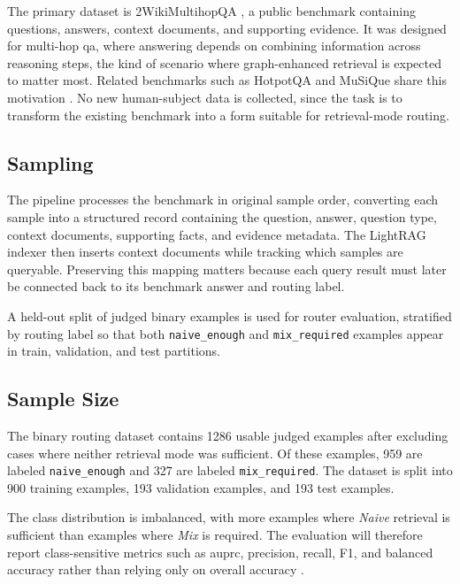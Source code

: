 \documentclass[english, bibtex]{kththesis}               %
\numberwithin{listing}{chapter}
\begin{document}
The primary dataset is 2WikiMultihopQA \cite{ho2020twowiki}, a public benchmark containing questions, answers, context documents, and supporting evidence. It was designed for multi-hop \gls{qa}, where answering depends on combining information across reasoning steps, the kind of scenario where graph-enhanced retrieval is expected to matter most. Related benchmarks such as HotpotQA and MuSiQue share this motivation \cite{yang2018hotpotqa,trivedi2022musique}. No new human-subject data is collected, since the task is to transform the existing benchmark into a form suitable for retrieval-mode routing.

\subsection{Sampling}

The pipeline processes the benchmark in original sample order, converting each sample into a structured record containing the question, answer, question type, context documents, supporting facts, and evidence metadata. The LightRAG indexer then inserts context documents while tracking which samples are queryable. Preserving this mapping matters because each query result must later be connected back to its benchmark answer and routing label.

A held-out split of judged binary examples is used for router evaluation, stratified by routing label so that both \texttt{naive\_enough} and \texttt{mix\_required} examples appear in train, validation, and test partitions.

\subsection{Sample Size}

The binary routing dataset contains 1286 usable judged examples after excluding cases where neither retrieval mode was sufficient. Of these examples, 959 are labeled \texttt{naive\_enough} and 327 are labeled \texttt{mix\_required}. The dataset is split into 900 training examples, 193 validation examples, and 193 test examples.

The class distribution is imbalanced, with more examples where \emph{Naive} retrieval is sufficient than examples where \emph{Mix} is required. The evaluation will therefore report class-sensitive metrics such as \gls{auprc}, precision, recall, F1, and balanced accuracy rather than relying only on overall accuracy \cite{saito2015precision}.
\end{document}
